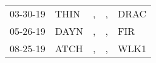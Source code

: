 \begin{supertabular}{lllll}
 03-30-19 &  THIN &  , &  , &  DRAC \\
 05-26-19 &  DAYN &  , &  , &   FIR \\
 08-25-19 &  ATCH &  , &  , &  WLK1 \\
\end{supertabular}
